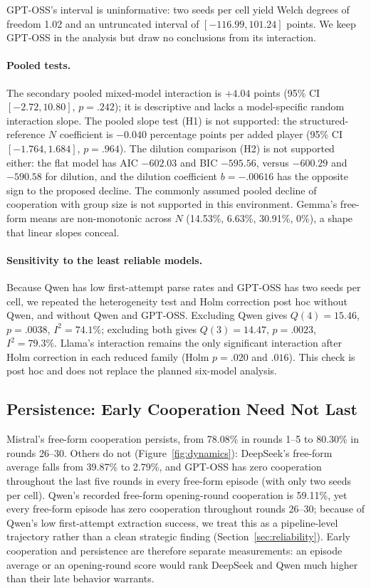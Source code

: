 \documentclass[11pt]{article}
\begin{document}
GPT-OSS's interval is uninformative: two seeds per cell yield Welch degrees of freedom 1.02 and an untruncated interval of $[-116.99,101.24]$ points. We keep GPT-OSS in the analysis but draw no conclusions from its interaction.

\paragraph{Pooled tests.}
The secondary pooled mixed-model interaction is $+4.04$ points (95\% CI $[-2.72,10.80]$, $p=.242$); it is descriptive and lacks a model-specific random interaction slope. The pooled slope test (H1) is not supported: the structured-reference $N$ coefficient is $-0.040$ percentage points per added player (95\% CI $[-1.764,1.684]$, $p=.964$). The dilution comparison (H2) is not supported either: the flat model has AIC $-602.03$ and BIC $-595.56$, versus $-600.29$ and $-590.58$ for dilution, and the dilution coefficient $b=-.00616$ has the opposite sign to the proposed decline. The commonly assumed pooled decline of cooperation with group size is not supported in this environment. Gemma's free-form means are non-monotonic across $N$ (14.53\%, 6.63\%, 30.91\%, 0\%), a shape that linear slopes conceal.

\paragraph{Sensitivity to the least reliable models.} Because Qwen has low first-attempt parse rates and GPT-OSS has two seeds per cell, we repeated the heterogeneity test and Holm correction post hoc without Qwen, and without Qwen and GPT-OSS. Excluding Qwen gives $Q(4)=15.46$, $p=.0038$, $I^2=74.1\%$; excluding both gives $Q(3)=14.47$, $p=.0023$, $I^2=79.3\%$. Llama's interaction remains the only significant interaction after Holm correction in each reduced family (Holm $p=.020$ and $.016$). This check is post hoc and does not replace the planned six-model analysis.

\subsection{Persistence: Early Cooperation Need Not Last}
\label{sec:persistence}
Mistral's free-form cooperation persists, from 78.08\% in rounds 1--5 to 80.30\% in rounds 26--30. Others do not (Figure~\ref{fig:dynamics}): DeepSeek's free-form average falls from 39.87\% to 2.79\%, and GPT-OSS has zero cooperation throughout the last five rounds in every free-form episode (with only two seeds per cell). Qwen's recorded free-form opening-round cooperation is 59.11\%, yet every free-form episode has zero cooperation throughout rounds 26--30; because of Qwen's low first-attempt extraction success, we treat this as a pipeline-level trajectory rather than a clean strategic finding (Section~\ref{sec:reliability}). Early cooperation and persistence are therefore separate measurements: an episode average or an opening-round score would rank DeepSeek and Qwen much higher than their late behavior warrants.
\end{document}
